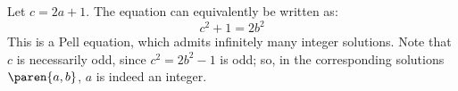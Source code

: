 Let $c = 2 a + 1$.
The equation can equivalently be written as:
\begin{equation*}
  c^2 + 1 = 2 b^2
\end{equation*}
This is a Pell equation, which admits infinitely many integer solutions.
Note that $c$ is necessarily odd, since $c^2 = 2 b^2 - 1$ is odd;
so, in the corresponding solutions $\paren{a, b}$, $a$ is indeed an integer.
